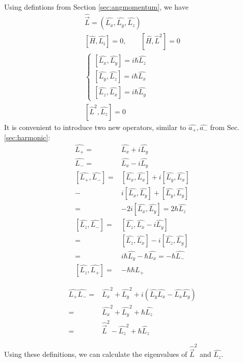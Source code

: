 			Using defintions from Section \ref{sec:angmomentum}, we have
			\begin{align}
				\hat{\vec{L}} = \left(\hat{L_x}, \hat{L_y}, \hat{L_z}\right) \\
				\left[\hat{H}, \hat{L_i}\right] = 0, \qquad \left[\hat{H}, \hat{L}^2\right] = 0 \\
				\left\{ \begin{aligned}
					\left[\hat{L_x}, \hat{L_y}\right] = i\hbar\hat{L_z} \\
					\left[\hat{L_y}, \hat{L_z}\right] = i\hbar\hat{L_x} \\
					\left[\hat{L_z}, \hat{L_x}\right] = i\hbar\hat{L_y}
				\end{aligned} \right. \\			
				\left[\hat{L}^2, \hat{L_z}\right] = 0
			\end{align}
			It is convenient to introduce two new operators, similar to $\hat{a_+}, \hat{a_-}$ from Sec.\ref{sec:harmonic}:
			\begin{align}
				\hat{L_+} =& \hat{L_x} + i\hat{L_y} \\
				\hat{L_-} =& \hat{L_x} - i\hat{L_y}	\\
				\left[\hat{L_+}, \hat{L_-}\right] =& \left[\hat{L_x}, \hat{L_x}\right] + i\left[\hat{L_y}, \hat{L_x}\right] \\
				-& i\left[\hat{L_x}, \hat{L_y}\right] + \left[\hat{L_y}, \hat{L_y}\right] \\
				=& -2i\left[\hat{L_x}, \hat{L_y}\right] = 2\hbar\hat{L_z} \\
				\left[\hat{L_z}, \hat{L_-}\right] =& \left[\hat{L_z}, \hat{L_x} -i\hat{L_y}\right]\\
				=& \left[\hat{L_z}, \hat{L_x}\right] - i\left[\hat{L_z}, \hat{L_y}\right]\\
				=& i\hbar\hat{L_y} -\hbar\hat{L_x} = -\hbar\hat{L_-} \\
				\left[\hat{L_z}, \hat{L_+}\right] =& -\hbar\hbar{L_+}
			\end{align}
			
			\begin{align}
				\hat{L_+}\hat{L_-} =& \hat{L_x}^2 + \hat{L_y}^2 + i\left(\hat{L_y}\hat{L_x} - \hat{L_x}\hat{L_y}\right) \\
				=& \hat{L_x}^2 + \hat{L_y}^2 + \hbar\hat{L_z} \\
				=& \hat{\vec{L}}^2 - \hat{L_z}^2 + \hbar\hat{L_z}
			\end{align}
			
			Using these definitions, we can calculate the eigenvalues of $\hat{\vec{L}}^2$ and $\hat{L_z}$.
			
